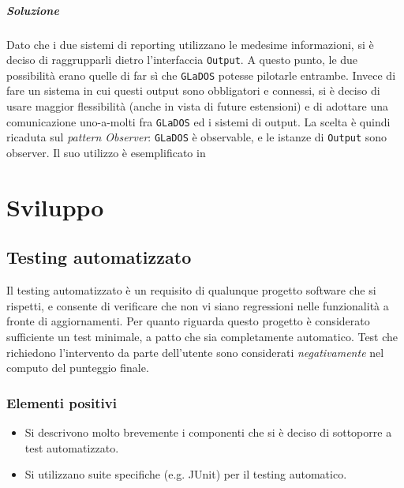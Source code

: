\documentclass[a4paper,12pt]{report}
\begin{document}
\paragraph{Soluzione} Dato che i due sistemi di reporting utilizzano le medesime informazioni, si è deciso di raggrupparli dietro l'interfaccia \texttt{Output}.
A questo punto, le due possibilità erano quelle di far sì che \texttt{GLaDOS} potesse pilotarle entrambe.
Invece di fare un sistema in cui questi output sono obbligatori e connessi, si è deciso di usare maggior flessibilità (anche in vista di future estensioni)
e di adottare una comunicazione uno-a-molti fra \texttt{GLaDOS} ed i sistemi di output.
La scelta è quindi ricaduta sul \textit{pattern Observer}: \texttt{GLaDOS} è observable, e le istanze di \texttt{Output} sono observer.
%
Il suo utilizzo è esemplificato in 

\chapter{Sviluppo}
\section{Testing automatizzato}

Il testing automatizzato è un requisito di qualunque progetto software che si rispetti, e consente di verificare che non vi siano regressioni nelle funzionalità a fronte di aggiornamenti.
%
Per quanto riguarda questo progetto è considerato sufficiente un test minimale, a patto che sia completamente automatico.
%
Test che richiedono l'intervento da parte dell'utente sono considerati \textit{negativamente} nel computo del punteggio finale.

\subsection*{Elementi positivi}

\begin{itemize}
 \item Si descrivono molto brevemente i componenti che si è deciso di sottoporre a test automatizzato.
 \item Si utilizzano suite specifiche (e.g. JUnit) per il testing automatico.
\end{itemize}
\end{document}

